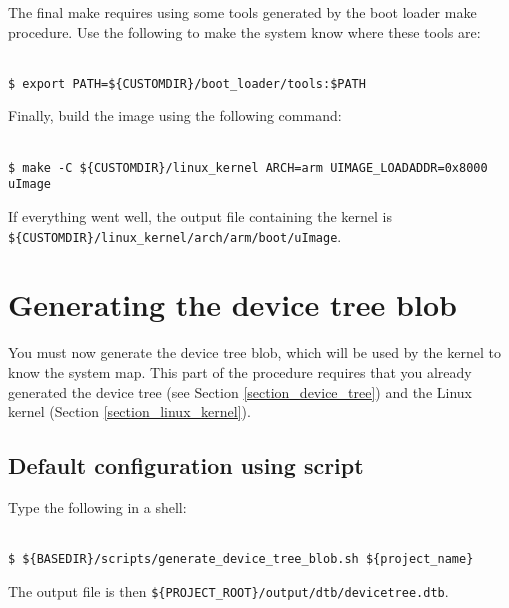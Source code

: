 \documentclass[openany,a4paper]{book}
\begin{document}
The final make requires using some tools generated by the boot loader make procedure.
Use the following to make the system know where these tools are:

\begin{tabbing}
\kill \hspace{1cm} \= \\
\> \texttt{\$ export PATH=\$\{CUSTOMDIR\}/boot\_loader/tools:\$PATH}\\
\end{tabbing}

Finally, build the image using the following command:

\begin{tabbing}
\kill \hspace{1cm} \= \\
\> \texttt{\$ make -C \$\{CUSTOMDIR\}/linux\_kernel ARCH=arm UIMAGE\_LOADADDR=0x8000 uImage}\\
\end{tabbing}

If everything went well, the output file containing the kernel is \nolinkurl{${CUSTOMDIR}/linux\_kernel/arch/arm/boot/uImage}.


\section{Generating the device tree blob}

You must now generate the device tree blob, which will be used by the kernel to know the system map.
This part of the procedure requires that you already generated the device tree (see Section \ref{section_device_tree}) and the Linux kernel (Section \ref{section_linux_kernel}).

\subsection{Default configuration using script}

Type the following in a shell:

\begin{tabbing}
\kill \hspace{1cm} \= \\
\> \texttt{\$ \$\{BASEDIR\}/scripts/generate\_device\_tree\_blob.sh \$\{project\_name\}}\\
\end{tabbing}

The output file is then \nolinkurl{${PROJECT_ROOT}/output/dtb/devicetree.dtb}.
\end{document}

